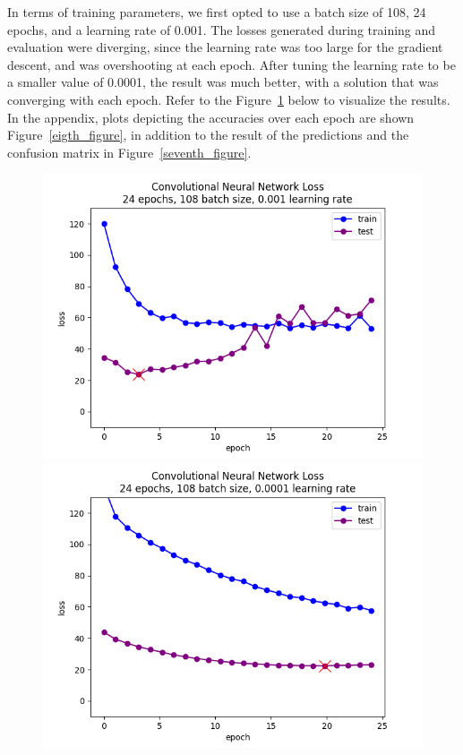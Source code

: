 \documentclass[10pt,twocolumn,letterpaper]{article}
\begin{document}
In terms of training parameters, we first opted to use a batch size of 108, 24 epochs, and a learning rate of 0.001. The losses generated during training and evaluation were diverging, since the learning rate was too large for the gradient descent, and was overshooting at each epoch. After tuning the learning rate to be a smaller value of 0.0001, the result was much better, with a solution that was converging with each epoch. Refer to the Figure~\ref{sixth_figure} below to visualize the results. In the appendix, plots depicting the accuracies over each epoch are shown Figure~\ref{eigth_figure}, in addition to the result of the predictions and the confusion matrix in Figure~\ref{seventh_figure}.
\begin{figure}[h]
   \begin{center}
       \includegraphics[width=\linewidth]{graphs/CNN/higher_learning_rate_loss_plot.png}
        \includegraphics[width=\linewidth]{graphs/CNN/loss_plot.png}
   \end{center}
        \vspace*{-6mm}
        \caption{\label{sixth_figure}}
\end{figure}
\end{document}
